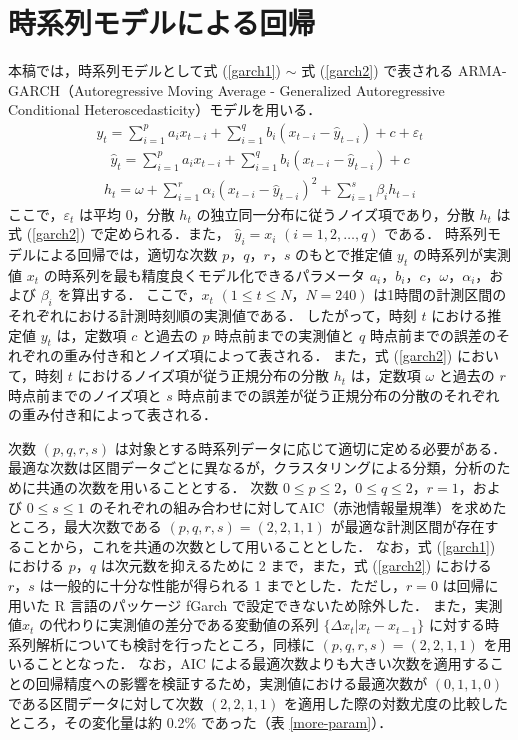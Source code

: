 \documentclass[technicalreport]{ieicej}
\begin{document}
\section{時系列モデルによる回帰}
本稿では，時系列モデルとして式 (\ref{garch1}) $\sim$ 式 (\ref{garch2}) で表される ARMA-GARCH（Autoregressive Moving Average - Generalized Autoregressive Conditional Heteroscedasticity）モデル\cite{lamoureux1990persistence}を用いる．
\begin{eqnarray}
y_t = \sum_{i=1}^p a_i x_{t-i} + \sum_{i=1}^q b_i (x_{t-i} - \widehat{y}_{t-i}) + c + \varepsilon_{t} 
\label{garch1}
\end{eqnarray}
\begin{eqnarray}
\widehat{y}_t = \sum_{i=1}^p a_i x_{t-i} + \sum_{i=1}^q b_i (x_{t-i} - \widehat{y}_{t-i}) + c
\end{eqnarray}
\begin{eqnarray}
\displaystyle h_{t} = \omega + \sum_{i=1}^{r}\alpha_i(x_{t-i} - \widehat{y}_{t-i})^2 + \sum_{i=1}^{s}\beta_ih_{t-i}
\label{garch2}
\end{eqnarray}
ここで，$\varepsilon_t$ は平均 0，分散 $h_t$ の独立同一分布に従うノイズ項であり，分散 $h_t$ は式 (\ref{garch2}) で定められる．また， $\widehat{y}_i = x_i$ $(i = 1,2,\ldots,q)$ である．
時系列モデルによる回帰では，適切な次数 $p，q，r，s$ のもとで推定値 $y_t$ の時系列が実測値 $x_t$ の時系列を最も精度良くモデル化できるパラメータ $a_i，b_i，c，\omega，\alpha_i，$および $\beta_i$ を算出する．
ここで，$x_t$ $(1\leq t\leq N，N=240)$ は1時間の計測区間のそれぞれにおける計測時刻順の実測値である．
したがって，時刻 $t$ における推定値 $y_t$ は，定数項 $c$ と過去の $p$ 時点前までの実測値と $q$ 時点前までの誤差のそれぞれの重み付き和とノイズ項によって表される．
また，式 (\ref{garch2}) において，時刻 $t$ におけるノイズ項が従う正規分布の分散 $h_t$ は，定数項 $\omega$ と過去の $r$ 時点前までのノイズ項と $s$ 時点前までの誤差が従う正規分布の分散のそれぞれの重み付き和によって表される．

次数 $(p,q,r,s)$ は対象とする時系列データに応じて適切に定める必要がある．
最適な次数は区間データごとに異なるが，クラスタリングによる分類，分析のために共通の次数を用いることとする．
次数 $0\leq p\leq2，0\leq q\leq 2，r=1$，および $0\leq s\leq 1$ のそれぞれの組み合わせに対してAIC（赤池情報量規準）\cite{bozdogan1987model}\cite{burnham2004multimodel}を求めたところ，最大次数である $(p,q,r,s)=(2,2,1,1)$ が最適な計測区間が存在することから，これを共通の次数として用いることとした．
なお，式 (\ref{garch1}) における $p，q$ は次元数を抑えるために 2 まで，また，式 (\ref{garch2}) における $r，s$ は一般的に十分な性能が得られる 1 までとした\cite{hansen2005forecast}．ただし，$r=0$ は回帰に用いた R 言語のパッケージ fGarch で設定できないため除外した．
また，実測値$ x_t$ の代わりに実測値の差分である変動値の系列 $\{\Delta x_t | x_t - x_{t-1} \}$ に対する時系列解析についても検討を行ったところ，同様に $(p,q,r,s)=(2,2,1,1)$ を用いることとなった．
なお，AIC による最適次数よりも大きい次数を適用することの回帰精度への影響を検証するため，実測値における最適次数が $(0,1,1,0) $である区間データに対して次数 $(2,2,1,1)$ を適用した際の対数尤度の比較したところ，その変化量は約 0.2\% であった（表 \ref{more-param}）．
\end{document}
